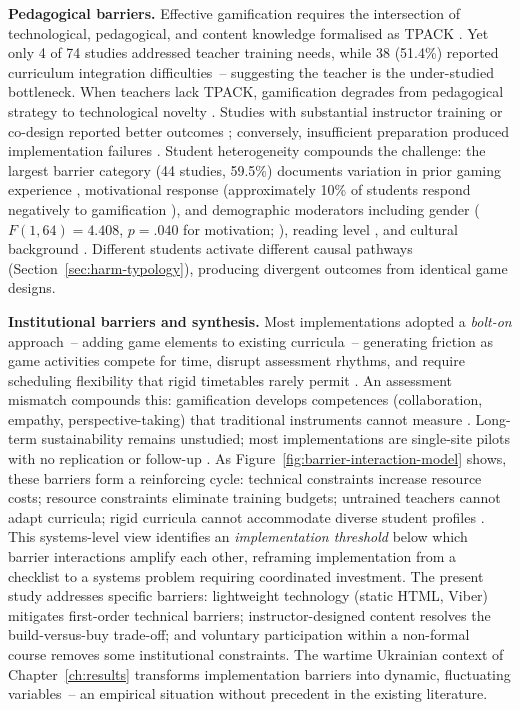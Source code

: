 \textbf{Pedagogical barriers.} Effective gamification requires the intersection of technological, pedagogical, and content knowledge formalised as TPACK \cite{Mishra2006, Koehler2013}. Yet only 4 of 74 studies addressed teacher training needs, while 38 (51.4\%) reported curriculum integration difficulties~-- suggesting the teacher is the under-studied bottleneck. When teachers lack TPACK, gamification degrades from pedagogical strategy to technological novelty \cite{Mercader2020}. Studies with substantial instructor training or co-design reported better outcomes \cite{61Karsenti202027, 36Scholz2021, Buisman2014}; conversely, insufficient preparation produced implementation failures \cite{60Hoy2018, 4Cruz2017}. Student heterogeneity compounds the challenge: the largest barrier category (44 studies, 59.5\%) documents variation in prior gaming experience \cite{49Huizenga2007127, 6Czerwinski2018}, motivational response (approximately 10\% of students respond negatively to gamification \cite{47Clara2010156}), and demographic moderators including gender ($F(1,64) = 4.408$, $p = .040$ for motivation; \citealt{8Yu2014}), reading level \cite{15Slater2022}, and cultural background \cite{66Rahmawati2023163}. Different students activate different causal pathways (Section~\ref{sec:harm-typology}), producing divergent outcomes from identical game designs.

\textbf{Institutional barriers and synthesis.} Most implementations adopted a \textit{bolt-on} approach~-- adding game elements to existing curricula~-- generating friction as game activities compete for time, disrupt assessment rhythms, and require scheduling flexibility that rigid timetables rarely permit \cite{61Karsenti202027, 57Huntley2011567, 49Huizenga2007127}. An assessment mismatch compounds this: gamification develops competences (collaboration, empathy, perspective-taking) that traditional instruments cannot measure \cite{3Watson2011466, 4Cruz2017}. Long-term sustainability remains unstudied; most implementations are single-site pilots with no replication or follow-up \cite{47Clara2010156, 2Mahamarowi2023133}. As Figure~\ref{fig:barrier-interaction-model} shows, these barriers form a reinforcing cycle: technical constraints increase resource costs; resource constraints eliminate training budgets; untrained teachers cannot adapt curricula; rigid curricula cannot accommodate diverse student profiles \cite{Ertmer1999, Mercader2020}. This systems-level view identifies an \textit{implementation threshold} below which barrier interactions amplify each other, reframing implementation from a checklist to a systems problem requiring coordinated investment. The present study addresses specific barriers: lightweight technology (static HTML, Viber) mitigates first-order technical barriers; instructor-designed content resolves the build-versus-buy trade-off; and voluntary participation within a non-formal course removes some institutional constraints. The wartime Ukrainian context of Chapter~\ref{ch:results} transforms implementation barriers into dynamic, fluctuating variables~-- an empirical situation without precedent in the existing literature.

